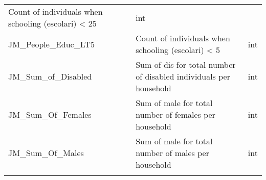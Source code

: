 \documentclass[11pt]{article}
\begin{document}
\begin{longtable}[]{@{}lll@{}}
\begin{minipage}[t]{0.12\columnwidth}
Count of individuals when schooling (escolari) \textless{} 25\strut
\end{minipage} & \begin{minipage}[t]{0.16\columnwidth}\raggedright\strut
int\strut
\end{minipage}\tabularnewline
\begin{minipage}[t]{0.63\columnwidth}\raggedright\strut
JM\_People\_Educ\_LT5\strut
\end{minipage} & \begin{minipage}[t]{0.12\columnwidth}\raggedright\strut
Count of individuals when schooling (escolari) \textless{} 5\strut
\end{minipage} & \begin{minipage}[t]{0.16\columnwidth}\raggedright\strut
int\strut
\end{minipage}\tabularnewline
\begin{minipage}[t]{0.63\columnwidth}\raggedright\strut
JM\_Sum\_of\_Disabled\strut
\end{minipage} & \begin{minipage}[t]{0.12\columnwidth}\raggedright\strut
Sum of dis for total number of disabled individuals per household\strut
\end{minipage} & \begin{minipage}[t]{0.16\columnwidth}\raggedright\strut
int\strut
\end{minipage}\tabularnewline
\begin{minipage}[t]{0.63\columnwidth}\raggedright\strut
JM\_Sum\_Of\_Females\strut
\end{minipage} & \begin{minipage}[t]{0.12\columnwidth}\raggedright\strut
Sum of male for total number of females per household\strut
\end{minipage} & \begin{minipage}[t]{0.16\columnwidth}\raggedright\strut
int\strut
\end{minipage}\tabularnewline
\begin{minipage}[t]{0.63\columnwidth}\raggedright\strut
JM\_Sum\_Of\_Males\strut
\end{minipage} & \begin{minipage}[t]{0.12\columnwidth}\raggedright\strut
Sum of male for total number of males per household\strut
\end{minipage} & \begin{minipage}[t]{0.16\columnwidth}\raggedright\strut
int\strut
\end{minipage}\tabularnewline
\begin{minipage}[t]{0.63\columnwidth}\raggedright\strut

\end{minipage}
\end{longtable}
\end{document}
